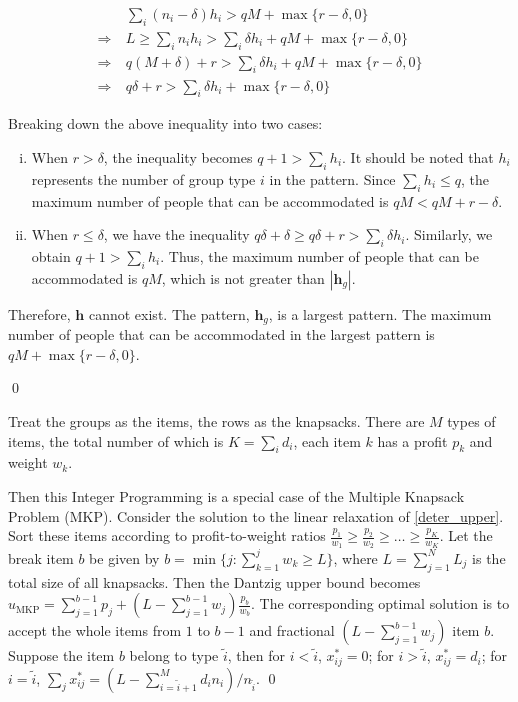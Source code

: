 \begin{pf}
\begin{align*}
  & \sum_{i} (n_i - \delta) h_i > q M + \max\{r-\delta, 0\} \\
  \Rightarrow ~& L \geq \sum_{i} n_i h_i > \sum_{i} \delta h_i + q M + \max\{r-\delta, 0\} \\
  \Rightarrow ~& q(M + \delta) + r > \sum_{i} \delta h_i + q M + \max\{r-\delta, 0\} \\
  \Rightarrow ~& q \delta + r > \sum_{i} \delta h_i + \max\{r-\delta, 0\}
\end{align*}

Breaking down the above inequality into two cases:

\begin{enumerate}[(i)]
  \item When $r > \delta$, the inequality becomes $q+1 > \sum_{i} h_i$. It should be noted that $h_i$ represents the number of group type $i$ in the pattern. Since $\sum_{i} h_i \leq q$, the maximum number of people that can be accommodated is $q M < q M + r-\delta$.  
  \item When $r \leq \delta$, we have the inequality $q \delta + \delta \geq q \delta + r > \sum_{i} \delta h_i$. Similarly, we obtain $q+1 > \sum_{i} h_i$. Thus, the maximum number of people that can be accommodated is $q M$, which is not greater than $|\bm{h}_{g}|$.  
\end{enumerate}

Therefore, $\bm{h}$ cannot exist. The pattern, $\bm{h}_{g}$, is a largest pattern. The maximum number of people that can be accommodated in the largest pattern is $q M + \max\{r-\delta, 0\}$. 

\qed
\end{pf}

\begin{pf}
  Treat the groups as the items, the rows as the knapsacks. There are $M$ types of items, the total number of which is $K = \sum_{i} d_i$, each item $k$ has a profit $p_k$ and weight $w_k$. 
  
  Then this Integer Programming is a special case of the Multiple Knapsack Problem (MKP). Consider the solution to the linear relaxation of \eqref{deter_upper}. Sort these items according to profit-to-weight ratios $\frac{p_1}{w_1} \geq \frac{p_2}{w_2} \geq \ldots \geq \frac{p_K}{w_K}$. 
  Let the break item $b$ be given by $b=\min \{j: \sum_{k=1}^j w_k \geq L\}$, where $L = \sum_{j=1}^{N} L_j$ is the total size of all knapsacks. Then the Dantzig upper bound \cite{dantzig1957discrete} becomes $u_{\mathrm{MKP}}=\sum_{j=1}^{b-1} p_j+\left(L-\sum_{j=1}^{b-1} w_j\right) \frac{p_b}{w_b}$. The corresponding optimal solution is to accept the whole items from $1$ to $b-1$ and fractional $(L-\sum_{j=1}^{b-1} w_j)$ item $b$. Suppose the item $b$ belong to type $\tilde{i}$, then for $i < \tilde{i}$, $x_{ij}^{*} = 0$; for $i > \tilde{i}$, $x_{ij}^{*} = d_{i}$; for $i = \tilde{i}$, $\sum_{j} x_{ij}^{*} = (L - \sum_{i = \tilde{i}+1}^{M} {d_i n_i})/ n_{\tilde{i}}$. \qed
\end{pf}


